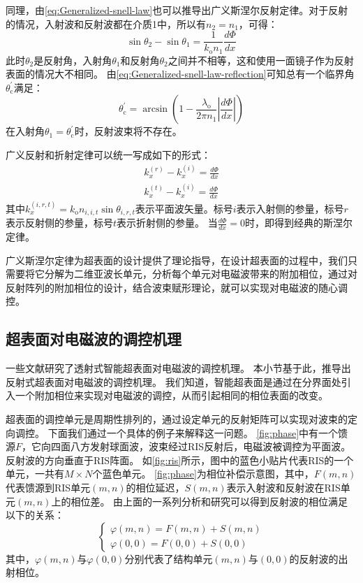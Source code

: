 \documentclass[supercite]{HustGraduPaper}
\begin{document}
同理，由\autoref{eq:Generalized-snell-law}也可以推导出广义斯涅尔反射定律。对于反射的情况，入射波和反射波都在介质1中，所以有$n_2=n_1$，可得：
\begin{equation}
	\sin \theta_2 - \sin \theta_1 = \frac{1}{k_\mathrm{o} n_1} \frac{d \Phi}{dx}
	\label{eq:Generalized-snell-law-reflection}
\end{equation}
此时$\theta_2$是反射角，入射角$\theta_1$和反射角$\theta_2$之间并不相等，这和使用一面镜子作为反射表面的情况大不相同。
由\autoref{eq:Generalized-snell-law-reflection}可知总有一个临界角$\theta_{\mathrm{c}}^{\prime}$满足：
\begin{equation}
	\theta_{\mathrm{c}}^{\prime}=\arcsin \left(1-\frac{\lambda_{\mathrm{o}}}{2 \pi n_{1}}\left|\frac{d \Phi}{d x}\right|\right)
\end{equation}
在入射角$\theta_1 = \theta_{\mathrm{c}}^{\prime}$时，反射波束将不存在。

广义反射和折射定律可以统一写成如下的形式\cite{ding2017gradient}：
\begin{eqnarray}
	k_{x}^{(r)}-k_{x}^{(i)}=\frac{d \Phi}{d x} \\
	k_{x}^{(t)}-k_{x}^{(i)}=\frac{d \Phi}{d x}
\end{eqnarray}
其中$k_{x}^{(i, r, t)}=k_{\mathrm{o}} n_{i, i, t} \sin \theta_{i, r, t}$表示平面波矢量。标号$i$表示入射侧的参量，标号$r$表示反射侧的参量，标号$t$表示折射侧的参量。
当$\frac{d \Phi}{d x}=0$时，即得到经典的斯涅尔定律。

广义斯涅尔定律为超表面的设计提供了理论指导，在设计超表面的过程中，我们只需要将它分解为二维亚波长单元，分析每个单元对电磁波带来的附加相位，通过对反射阵列的附加相位的设计，结合波束赋形理论，就可以实现对电磁波的随心调控。

\subsection{超表面对电磁波的调控机理}

一些文献研究了透射式智能超表面对电磁波的调控机理。
本小节基于此，推导出反射式超表面对电磁波的调控机理\cite{Chen2018dian}。
我们知道，智能超表面是通过在分界面处引入一个附加相位来实现对电磁波的调控，从而引起相同的相位表面的改变。

超表面的调控单元是周期性排列的，通过设定单元的反射矩阵可以实现对波束的定向调控。
下面我们通过一个具体的例子来解释这一问题。
\autoref{fig:phase}中有一个馈源$F$，它向四面八方发射球面波，波束经过RIS反射后，电磁波被调控为平面波。
反射波的方向垂直于RIS阵面。
如\autoref{fig:ris}所示，图中的蓝色小贴片代表RIS的一个单元，一共有$M \times N$个蓝色单元。
\autoref{fig:phase}为相位补偿示意图，其中，$F(m,n)$代表馈源到RIS单元$(m,n)$的相位延迟，$S(m,n)$表示入射波和反射波在RIS单元$(m,n)$上的相位差。
由上面的一系列分析和研究可以得到反射波的相位满足以下的关系：
\begin{equation}
	\left\{
		\begin{array}{l}
			\varphi(m,n)=F(m,n)+S(m,n) \\
			\varphi(0,0)=F(0,0)+S(0,0)
		\end{array}
	\right.
\end{equation}
其中，$\varphi(m,n)$与$\varphi(0,0)$分别代表了结构单元$(m,n)$与$(0,0)$的反射波的出射相位。
 
\end{document}
